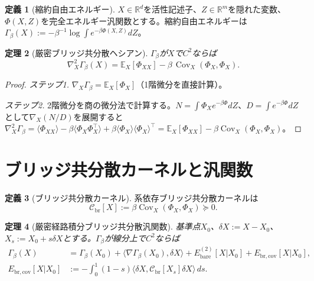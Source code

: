 \documentclass[12pt]{article}
\theoremstyle{plain}
\newtheorem{theorem}{定理}[section]
\theoremstyle{definition}
\newtheorem{definition}[theorem]{定義}
\numberwithin{equation}{section}
\newcommand{\R}{\mathbb{R}}
\newcommand{\br}{\mathrm{br}}
\DeclareMathOperator{\Cov}{Cov}
\begin{document}
\begin{definition}[縮約自由エネルギー]\label{def:Gamma}
$X\in\R^d$を活性記述子、$Z\in\R^m$を隠れた変数、$\Phi(X,Z)$を完全エネルギー汎関数とする。縮約自由エネルギーは
$\Gamma_\beta(X):=-\beta^{-1}\log\int e^{-\beta\Phi(X,Z)}dZ$。
\end{definition}

\begin{theorem}[厳密ブリッジ共分散ヘシアン]\label{thm:hessian}
$\Gamma_\beta$が$X$で$C^2$ならば
\begin{equation}\label{eq:hessian}
\boxed{\nabla_X^2\Gamma_\beta(X) = \mathbb{E}_X[\Phi_{XX}] - \beta\,\Cov_X(\Phi_X,\Phi_X).}
\end{equation}
\end{theorem}

\begin{proof}
\emph{ステップ1.} $\nabla_X\Gamma_\beta=\mathbb{E}_X[\Phi_X]$（1階微分を直接計算）。

\emph{ステップ2.} 2階微分を商の微分法で計算する。$N=\int\Phi_X e^{-\beta\Phi}dZ$、$D=\int e^{-\beta\Phi}dZ$として$\nabla_X(N/D)$を展開すると
$\nabla_X^2\Gamma_\beta = \langle\Phi_{XX}\rangle - \beta\langle\Phi_X\Phi_X^\top\rangle + \beta\langle\Phi_X\rangle\langle\Phi_X\rangle^\top = \mathbb{E}_X[\Phi_{XX}] - \beta\Cov_X(\Phi_X,\Phi_X)$。
\end{proof}


\section{ブリッジ共分散カーネルと汎関数}\label{sec:covariance}

\begin{definition}[ブリッジ共分散カーネル]\label{def:Cbr}
系依存ブリッジ共分散カーネルは
\begin{equation}
\boxed{\mathcal{C}_{\br}[X]
:= \beta\Cov_X(\Phi_X,\Phi_X) \succeq 0.}
\end{equation}
\end{definition}

\begin{theorem}[厳密経路積分ブリッジ共分散汎関数]\label{thm:functional}
基準点$X_0$、$\delta X:=X-X_0$、$X_s:=X_0+s\delta X$とする。$\Gamma_\beta$が線分上で$C^2$ならば
\begin{align}
\Gamma_\beta(X) &= \Gamma_\beta(X_0) + \langle\nabla\Gamma_\beta(X_0),\delta X\rangle + E_{\mathrm{bare}}^{(2)}[X|X_0] + E_{\br,\mathrm{cov}}[X|X_0],\\
\boxed{E_{\br,\mathrm{cov}}[X|X_0]} &\boxed{:= -\int_0^1(1-s)\langle\delta X,\mathcal{C}_{\br}[X_s]\delta X\rangle\,ds.}
\end{align}
\end{theorem}
\end{document}
